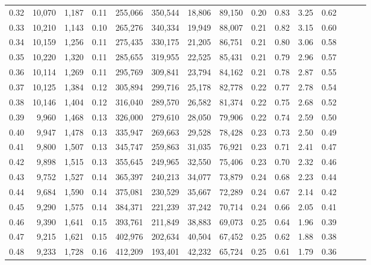 \begin{tabular}{rrrrrrrrrrrrrrr}
0.32 &  10,070 &  1,187 &  0.11 &  255,066 &  350,544 &   18,806 &   89,150 &  0.20 &  0.83 &  3.25 &      0.62 \\
0.33 &  10,210 &  1,143 &  0.10 &  265,276 &  340,334 &   19,949 &   88,007 &  0.21 &  0.82 &  3.15 &      0.60 \\
0.34 &  10,159 &  1,256 &  0.11 &  275,435 &  330,175 &   21,205 &   86,751 &  0.21 &  0.80 &  3.06 &      0.58 \\
0.35 &  10,220 &  1,320 &  0.11 &  285,655 &  319,955 &   22,525 &   85,431 &  0.21 &  0.79 &  2.96 &      0.57 \\
0.36 &  10,114 &  1,269 &  0.11 &  295,769 &  309,841 &   23,794 &   84,162 &  0.21 &  0.78 &  2.87 &      0.55 \\
0.37 &  10,125 &  1,384 &  0.12 &  305,894 &  299,716 &   25,178 &   82,778 &  0.22 &  0.77 &  2.78 &      0.54 \\
0.38 &  10,146 &  1,404 &  0.12 &  316,040 &  289,570 &   26,582 &   81,374 &  0.22 &  0.75 &  2.68 &      0.52 \\
0.39 &   9,960 &  1,468 &  0.13 &  326,000 &  279,610 &   28,050 &   79,906 &  0.22 &  0.74 &  2.59 &      0.50 \\
0.40 &   9,947 &  1,478 &  0.13 &  335,947 &  269,663 &   29,528 &   78,428 &  0.23 &  0.73 &  2.50 &      0.49 \\
0.41 &   9,800 &  1,507 &  0.13 &  345,747 &  259,863 &   31,035 &   76,921 &  0.23 &  0.71 &  2.41 &      0.47 \\
0.42 &   9,898 &  1,515 &  0.13 &  355,645 &  249,965 &   32,550 &   75,406 &  0.23 &  0.70 &  2.32 &      0.46 \\
0.43 &   9,752 &  1,527 &  0.14 &  365,397 &  240,213 &   34,077 &   73,879 &  0.24 &  0.68 &  2.23 &      0.44 \\
0.44 &   9,684 &  1,590 &  0.14 &  375,081 &  230,529 &   35,667 &   72,289 &  0.24 &  0.67 &  2.14 &      0.42 \\
0.45 &   9,290 &  1,575 &  0.14 &  384,371 &  221,239 &   37,242 &   70,714 &  0.24 &  0.66 &  2.05 &      0.41 \\
0.46 &   9,390 &  1,641 &  0.15 &  393,761 &  211,849 &   38,883 &   69,073 &  0.25 &  0.64 &  1.96 &      0.39 \\
0.47 &   9,215 &  1,621 &  0.15 &  402,976 &  202,634 &   40,504 &   67,452 &  0.25 &  0.62 &  1.88 &      0.38 \\
0.48 &   9,233 &  1,728 &  0.16 &  412,209 &  193,401 &   42,232 &   65,724 &  0.25 &  0.61 &  1.79 &      0.36 \\

\end{tabular}
